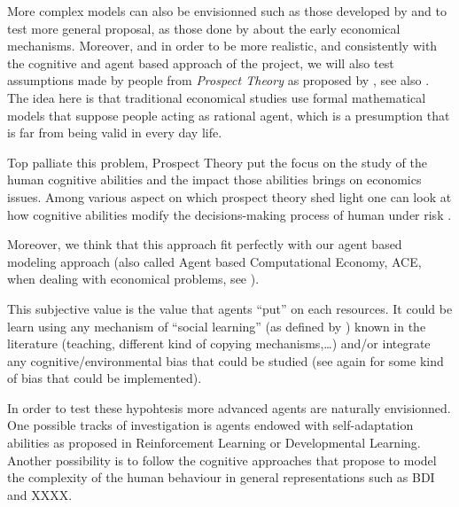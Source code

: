 \documentclass{wscpaperproc}
\begin{document}
More complex models can also be envisionned such as those developed by 
\cite{rubinstein_equilibrium_1985} and to test more general proposal, as those done by \cite{polanyi_trade_1957,polanyi_livelihood_1977} about the early economical mechanisms. Moreover, and in order to be more realistic, and consistently with the cognitive and agent based approach of the project, we will also test assumptions made by people from \emph{Prospect Theory} as proposed by 
\cite{kahneman_prospect_1979}, see also
\cite{camerer_prospect_2004}. The idea here is that traditional economical studies use formal mathematical models that suppose people acting as rational agent, which is a presumption that is far from being valid  in every day life. 

Top palliate this problem, Prospect Theory put the focus on the study of the human cognitive abilities and the impact those abilities brings on economics issues. Among various aspect on which prospect theory shed light one can look at how cognitive abilities modify the decisions-making process of human under risk
\cite{weber_disposition_1998}.

Moreover, we think that this approach fit perfectly with our agent based modeling approach (also called Agent based Computational Economy, ACE, when dealing with economical problems, see
\cite{tesfatsion_introduction_2001}).


This subjective value is the value that agents ``put'' on each resources. It could be learn using any mechanism of ``social learning'' (as defined by \cite{lycett_cultural_2015}) known in the literature (teaching, different kind of copying mechanisms,\ldots) and/or integrate any cognitive/environmental bias that could be studied (see again \cite{lycett_cultural_2015} for some kind of bias that could be implemented).

In order to test these hypohtesis more advanced agents are naturally envisionned. One possible tracks of investigation is agents endowed with self-adaptation abilities as proposed in Reinforcement Learning or Developmental Learning. Another possibility is to follow the cognitive approaches that propose to model the complexity of the human behaviour in general representations such as BDI and XXXX.



  
\end{document}

